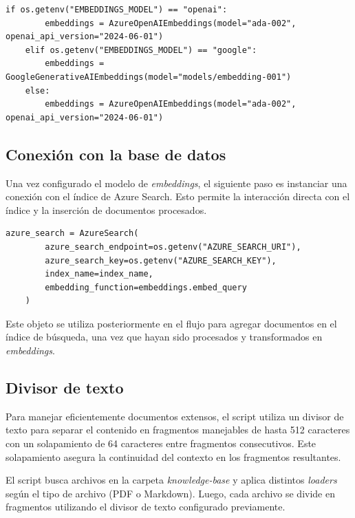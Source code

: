 \begin{lstlisting}[label=cod:update-db-3,caption=Configuración del modelo de \textit{embeddings}.]
	if os.getenv("EMBEDDINGS_MODEL") == "openai":
		embeddings = AzureOpenAIEmbeddings(model="ada-002", openai_api_version="2024-06-01")
	elif os.getenv("EMBEDDINGS_MODEL") == "google":    
		embeddings = GoogleGenerativeAIEmbeddings(model="models/embedding-001")
	else:
		embeddings = AzureOpenAIEmbeddings(model="ada-002", openai_api_version="2024-06-01")
\end{lstlisting}

\subsection{Conexión con la base de datos}

Una vez configurado el modelo de \textit{embeddings}, el siguiente paso es instanciar una conexión con el índice de Azure Search. 
Esto permite la interacción directa con el índice y la inserción de documentos procesados.

\begin{lstlisting}[label=cod:update-db-4,caption=Conexión con la base de datos.]
	azure_search = AzureSearch(
		azure_search_endpoint=os.getenv("AZURE_SEARCH_URI"),
		azure_search_key=os.getenv("AZURE_SEARCH_KEY"),
		index_name=index_name,
		embedding_function=embeddings.embed_query
	)
\end{lstlisting}

Este objeto se utiliza posteriormente en el flujo para agregar documentos en el índice de búsqueda, una vez que hayan sido procesados y transformados en \textit{embeddings}.

\subsection{Divisor de texto}

Para manejar eficientemente documentos extensos, el script utiliza un divisor de texto para separar el contenido en fragmentos manejables 
de hasta 512 caracteres con un solapamiento de 64 caracteres entre fragmentos consecutivos. Este solapamiento asegura la continuidad del
contexto en los fragmentos resultantes.

El script busca archivos en la carpeta \textit{knowledge-base} y aplica distintos \textit{loaders} según el tipo de archivo (PDF o Markdown). Luego, 
cada archivo se divide en fragmentos utilizando el divisor de texto configurado previamente.

